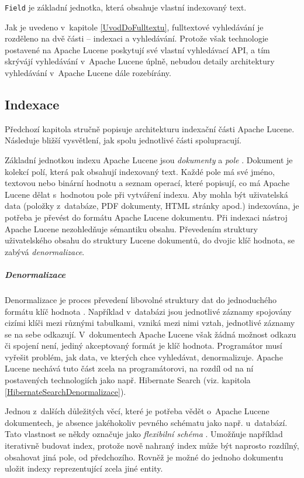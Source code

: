 \documentclass[11pt,oneside]{fithesis2}
\begin{document}
\texttt{Field} je základní jednotka, která obsahuje vlastní indexovaný text.

Jak je uvedeno v~kapitole \ref{UvodDoFulltextu}, fulltextové vyhledávání je rozděleno na dvě části -- indexaci a vyhledávání. Protože však technologie postavené na Apache Lucene poskytují své vlastní vyhledávací API, a tím skrývájí vyhledávání v~Apache Lucene úplně, nebudou detaily architektury vyhledávání v~Apache Lucene dále rozebírány. 

\subsection{Indexace}
Předchozí kapitola stručně popisuje architekturu indexační části Apache Lucene. Následuje bližší vysvětlení, jak spolu jednotlivé části spolupracují.

Základní jednotkou indexu Apache Lucene jsou \emph{dokumenty} a \emph{pole} \cite[s.~32]{LuceneAction}. Dokument je kolekcí polí, která pak obsahují indexovaný text. Každé pole má své jméno, textovou nebo binární hodnotu a seznam operací, které popisují, co má Apache Lucene dělat s~hodnotou pole při vytváření indexu. Aby mohla být uživatelská data (položky z~databáze, PDF dokumenty, HTML stránky apod.) indexována, je potřeba je převést do formátu Apache Lucene dokumentu. Při indexaci nástroj Apache Lucene nezohledňuje sémantiku obsahu. Převedením struktury uživatelského obsahu do struktury Lucene dokumentů, do dvojic klíč hodnota, se zabývá \emph{denormalizace}.

\subparagraph{Denormalizace}
\label{Denormalizace}
Denormalizace je proces převedení libovolné struktury dat do jednoduchého formátu klíč hodnota \cite[s.~34]{LuceneAction}. Například v~databázi jsou jednotlivé záznamy spojovány cizími klíči mezi různými tabulkami, vzniká mezi nimi vztah, jednotlivé záznamy se na sebe odkazují. V~dokumentech Apache Lucene však žádná možnost odkazu či spojení není, jediný akceptovaný formát je klíč hodnota. Programátor musí vyřešit problém, jak data, ve kterých chce vyhledávat, denormalizuje. Apache Lucene nechává tuto část zcela na programátorovi, na rozdíl od na ní postavených technologiích jako např. Hibernate Search (viz. kapitola \ref{HibernateSearchDenormalizace}).

Jednou z~dalších důležitých věcí, které je potřeba vědět o~Apache Lucene dokumentech, je absence jakéhokoliv pevného schématu jako např. u~databází. Tato vlastnost se někdy označuje jako \emph{flexibilní schéma} \cite[s.~34]{LuceneAction}. Umožňuje například iterativně budovat index, protože nově nahraný index může být naprosto rozdílný, obsahovat jiná pole, od předchozího. Rovněž je možné do jednoho dokumentu uložit indexy reprezentující zcela jiné entity.
\end{document}
